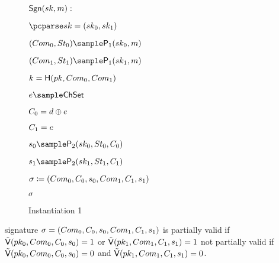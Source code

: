 \begin{definition}
\begin{center}
\begin{figure}[htb!]
{\begin{minipage}[t]{0.51\textwidth}
                       
        \end{minipage}
        \begin{minipage}[t]{0.5\textwidth}
            \underline{$\mathsf{Sgn}(sk,m):$}
            \begin{nicodemus}
            	\item $\pcparse \sk = (\sk_0,\sk_1) $
            	\item	$(\com_0,\st_0)\sample\IDP_1(\sk_0,\m)$
		\item $(\com_1,\st_1)\sample\IDP_1(\sk_1,\m)$ 
		\item $ k = \mathsf{H}(pk,Com_0,Com_1) $
  		\item $ e \sample \ChSet$
		\item $ C_0 = d\oplus e $
		\item $C_1 = e$  
		\item $\s_0 \sample\IDP_2(\sk_0,\st_0,\c_0)$
		\item $ \s_1 \sample\IDP_2(\sk_1,\st_1,\c_1)$
		\item $\sigma \coloneqq (Com_0,C_0,s_0, Com_1, C_1,s_1)$
		\item \pcreturn $\sigma$
            \end{nicodemus}

        \end{minipage}

    }
    \caption{Instantiation 1}
    \label{fig:prf-security}
\end{figure}
\end{center}
\end{definition}

\begin{definition}
signature  $\sigma = (Com_{0},C_{0},s_{0}, Com_{1}, C_{1},s_{1})$ is
partially valid if $\tilde{\mathsf{V}}(pk_0,Com_0,C_0,s_0) =1$ or $\tilde{\mathsf{V}}(pk_1,Com_1,C_1,s_1) = 1$
not partially valid if 
 $\tilde{\mathsf{V}}(pk_0,Com_0,C_0,s_0) =0$ and $\tilde{\mathsf{V}}(pk_1,Com_1,C_1,s_1) =0$.

\end{definition}
